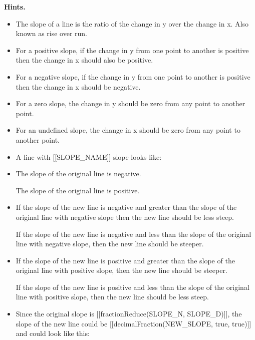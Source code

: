 \documentclass{article}
\begin{document}
\textbf{Hints.}
\begin{itemize}
  \item The slope of a line is the ratio of the change in
                    y over the change in x. Also
                    known as rise over run.
  \item For a positive slope, if the change in y from
                    one point to another is positive then the change in
                    x should also be positive.
  \item For a negative slope, if the change in y from
                    one point to another is positive then the change in
                    x should be negative.
  \item For a zero slope, the change in y should be
                    zero from any point to another point.
  \item For an undefined slope, the change in x should
                    be zero from any point to another point.
  \item A line with [[SLOPE\_NAME]] slope looks like:
  \item The slope of the original line is negative.
                    
                        The slope of the original line is positive.
  \item If the slope of the new line is negative and
                            greater than the slope of the original line with
                            negative slope then the new line should be less
                            steep.
                        
                    
                    
                        
                            If the slope of the new line is negative and less
                            than the slope of the original line with negative
                            slope, then the new line should be steeper.
  \item If the slope of the new line is positive and greater
                            than the slope of the original line with positive
                            slope, then the new line should be steeper.
                        
                    
                    
                        
                            If the slope of the new line is positive and less
                            than the slope of the original line with positive
                            slope, then the new line should be less steep.
  \item Since the original slope is 
                        [[fractionReduce(SLOPE\_N, SLOPE\_D)]],
                        the slope of the new line could be 
                        [[decimalFraction(NEW\_SLOPE, true, true)]]
                         and could look like this:
\end{itemize}
\end{document}
